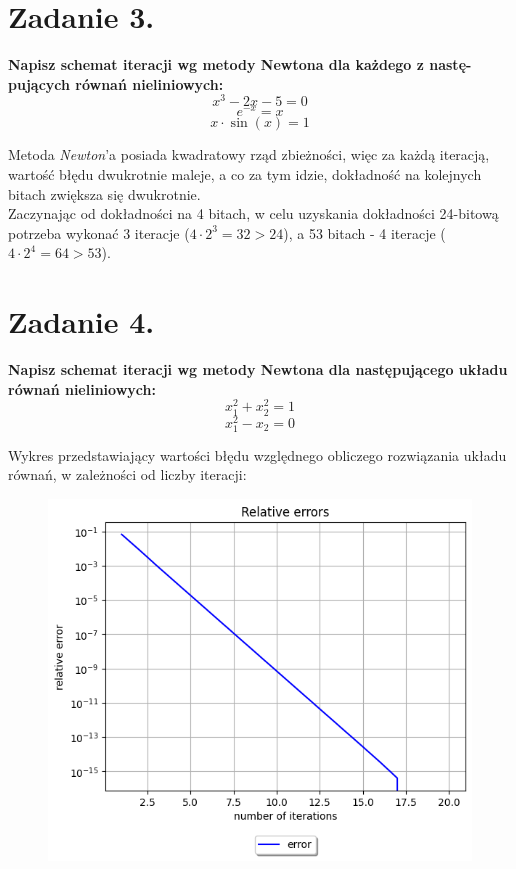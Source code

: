 \documentclass{article}
\begin{document}
\section*{Zadanie 3.}
\textbf{Napisz schemat iteracji wg metody Newtona dla każdego z nastę-
pujących równań nieliniowych:
$$x^3-2x-5=0$$
$$e^{-x} = x$$
$$x\cdot\sin(x) = 1$$}


Metoda \textit{Newton}'a posiada kwadratowy rząd zbieżności, więc za każdą iteracją,
wartość błędu dwukrotnie maleje, a co za tym idzie, dokładność na kolejnych bitach zwiększa się dwukrotnie.\\
Zaczynając od dokładności na 4 bitach, w celu uzyskania dokładności 24-bitową potrzeba wykonać
3 iteracje ($4\cdot 2^3 = 32 > 24$), a 53 bitach - 4 iteracje ($4\cdot 2^4 = 64 > 53$).


\section*{Zadanie 4.}
\textbf{Napisz schemat iteracji wg metody Newtona dla następującego
układu równań nieliniowych:
$$x_1^2 + x_2^2 = 1$$
$$x_1^2 - x_2 = 0$$}

Wykres przedstawiający wartości błędu względnego obliczego rozwiązania
układu równań, w zależności od liczby iteracji:
\begin{figure}[H]
  \includegraphics[width=\linewidth]{figures/multivariable.png}
\end{figure}
\end{document}
